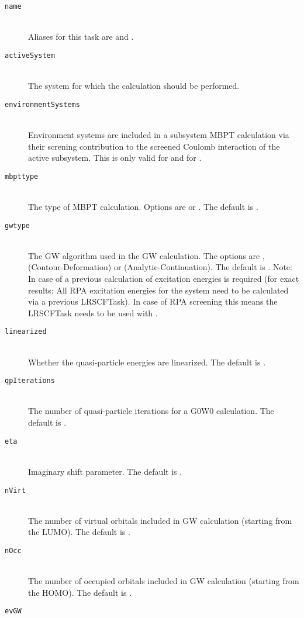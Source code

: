 \begin{description}
  \item [\texttt{name}]\hfill \\
  Aliases for this task are  and .
  \item [\texttt{activeSystem}]\hfill \\
  The system for which the calculation should be performed.
  \item [\texttt{environmentSystems}]\hfill \\
  Environment systems are included in a subsystem MBPT calculation via their screning contribution to the screened Coulomb interaction of the active subsystem. This is only valid for  and for .  
  \item [\texttt{mbpttype}]\hfill \\
  The type of MBPT calculation. Options are  or . The default is .
  \item [\texttt{gwtype}]\hfill \\
  The GW algorithm used in the GW calculation. The options are ,  (Contour-Deformation) or  (Analytic-Continuation). The default is . Note: In case of  a previous calculation of excitation energies is required (for exact results: All RPA excitation energies for the system need to be calculated via a previous LRSCFTask). In case of RPA screening this means the LRSCFTask needs to be used with .
  \item [\texttt{linearized}]\hfill \\
  Whether the quasi-particle energies are linearized. The default is .
  \item [\texttt{qpIterations}]\hfill \\
  The number of quasi-particle iterations for a G0W0 calculation. The default is .
  \item [\texttt{eta}]\hfill \\
  Imaginary shift parameter. The default is .
  \item [\texttt{nVirt}]\hfill \\
  The number of virtual orbitals included in GW calculation (starting from the LUMO). The default is .
  \item [\texttt{nOcc}]\hfill \\
  The number of occupied orbitals included in GW calculation (starting from the HOMO). The default is .
  \item [\texttt{evGW}]\hfill \\

\end{description}
